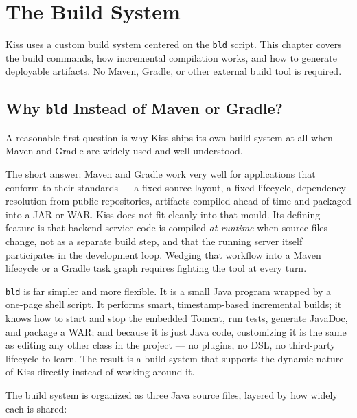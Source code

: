 \chapter{The Build System}
\label{ch:build}

Kiss uses a custom build system centered on the \texttt{bld} script.  This chapter covers the build commands, how incremental compilation works, and how to generate deployable artifacts.  No Maven, Gradle, or other external build tool is required.

\section{Why \texttt{bld} Instead of Maven or Gradle?}
\label{sec:build-why-bld}

A reasonable first question is why Kiss ships its own build system at all when Maven and Gradle are widely used and well understood.

The short answer: Maven and Gradle work very well for applications that conform to their standards --- a fixed source layout, a fixed lifecycle, dependency resolution from public repositories, artifacts compiled ahead of time and packaged into a JAR or WAR.  Kiss does not fit cleanly into that mould.  Its defining feature is that backend service code is compiled \emph{at runtime} when source files change, not as a separate build step, and that the running server itself participates in the development loop.  Wedging that workflow into a Maven lifecycle or a Gradle task graph requires fighting the tool at every turn.

\texttt{bld} is far simpler and more flexible.  It is a small Java program wrapped by a one-page shell script.  It performs smart, timestamp-based incremental builds; it knows how to start and stop the embedded Tomcat, run tests, generate JavaDoc, and package a WAR; and because it is just Java code, customizing it is the same as editing any other class in the project --- no plugins, no DSL, no third-party lifecycle to learn.  The result is a build system that supports the dynamic nature of Kiss directly instead of working around it.

The build system is organized as three Java source files, layered by how widely each is shared:

